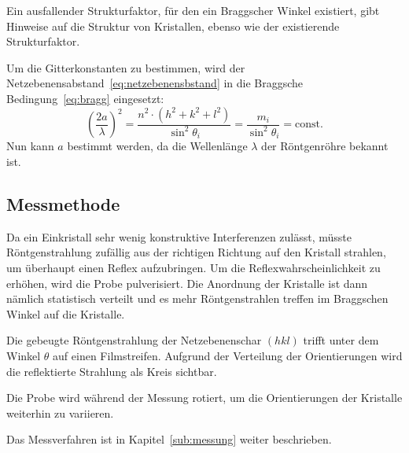 Ein ausfallender Strukturfaktor, für den ein Braggscher Winkel existiert,
gibt Hinweise auf die Struktur von Kristallen,
ebenso wie der existierende Strukturfaktor.

Um die Gitterkonstanten zu bestimmen,
wird der Netzebenensabstand~\ref{eq:netzebenensbstand}
in die Braggsche Bedingung~\ref{eq:bragg} eingesetzt:
\begin{equation}
  \label{eq:const}
  {\left(\frac{2a}{\lambda}\right)}^2
  = \frac{n^2 \cdot \left(h^2 + k^2 + l^2\right)}{\sin^2\!\theta_i}
  = \frac{m_i}{\sin^2\!\theta_i} = \text{const.}
\end{equation}
Nun kann $a$ bestimmt werden, da die Wellenlänge $\lambda$ der Röntgenröhre bekannt ist.


\subsection{Messmethode}
\label{sec:Messmethode}
Da ein Einkristall sehr wenig konstruktive Interferenzen zulässt,
müsste Röntgenstrahlung zufällig aus der richtigen Richtung auf den Kristall
strahlen, um überhaupt einen Reflex aufzubringen.
Um die Reflexwahrscheinlichkeit zu erhöhen, wird die Probe pulverisiert.
Die Anordnung der Kristalle ist dann nämlich statistisch verteilt
und es mehr Röntgenstrahlen treffen im Braggschen Winkel auf die Kristalle.

Die gebeugte Röntgenstrahlung der Netzebenenschar $(hkl)$ trifft unter
dem Winkel $\theta$ auf einen Filmstreifen.
Aufgrund der Verteilung der Orientierungen wird die reflektierte Strahlung
als Kreis sichtbar.

Die Probe wird während der Messung rotiert, um die Orientierungen der Kristalle
weiterhin zu variieren.

Das Messverfahren ist in Kapitel~\ref{sub:messung} weiter beschrieben.

